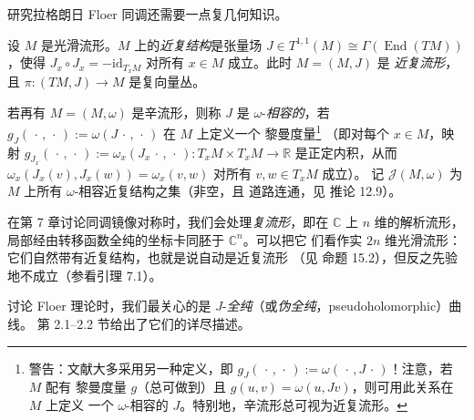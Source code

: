 研究拉格朗日 Floer 同调还需要一点复几何知识。

\begin{Def}\label{def:5.6}
设 $M$ 是光滑流形。$M$ 上的\emph{近复结构}是张量场
$J\in T^{1,1}(M)\cong\Gamma(\operatorname{End}(TM))$，使得
$J_x\circ J_x=-\mathrm{id}_{T_xM}$ 对所有 $x\in M$ 成立。此时 $M=(M,J)$ 是
\emph{近复流形}，且 $\pi:(TM,J)\to M$ 是复向量丛。

若再有 $M=(M,\omega)$ 是辛流形，则称 $J$ 是 $\omega$-\emph{相容的}，若
$g_J(\,\cdot\,,\,\cdot\,):=\omega(J\,\cdot\,,\,\cdot\,)$ 在 $M$ 上定义一个
黎曼度量\footnote{警告：文献大多采用另一种定义，即
$g_J(\,\cdot\,,\,\cdot\,):=\omega(\,\cdot\,,J\,\cdot\,)$！注意，若 $M$ 配有
黎曼度量 $g$（总可做到）且 $g(u,v)=\omega(u,Jv)$，则可用此关系在 $M$ 上定义
一个 $\omega$-相容的 $J$。特别地，辛流形总可视为近复流形。}
（即对每个 $x\in M$，映射
$g_{J_x}(\,\cdot\,,\,\cdot\,):=\omega_x(J_x\,\cdot\,,\,\cdot\,):
T_xM\times T_xM\to\mathbb R$ 是正定内积，从而
$\omega_x(J_x(v),J_x(w))=\omega_x(v,w)$ 对所有 $v,w\in T_xM$ 成立）。
记 $\mathcal J(M,\omega)$ 为 $M$ 上所有 $\omega$-相容近复结构之集（非空，且
道路连通，见 \cite{Sil12} 推论 12.9）。
\end{Def}


在第 7 章讨论同调镜像对称时，我们会处理\emph{复流形}，即在 $\mathbb C$ 上
$n$ 维的解析流形，局部经由转移函数全纯的坐标卡同胚于 $\mathbb C^n$。可以把它
们看作实 $2n$ 维光滑流形：它们自然带有近复结构，也就是说自动是近复流形
（见 \cite{Sil12} 命题 15.2），但反之先验地不成立（参看引理 7.1）。

讨论 Floer 理论时，我们最关心的是 $J$-\emph{全纯}（或\emph{伪全纯}，pseudoholomorphic）曲线。
\cite{Wen14} 第 2.1–2.2 节给出了它们的详尽描述。

